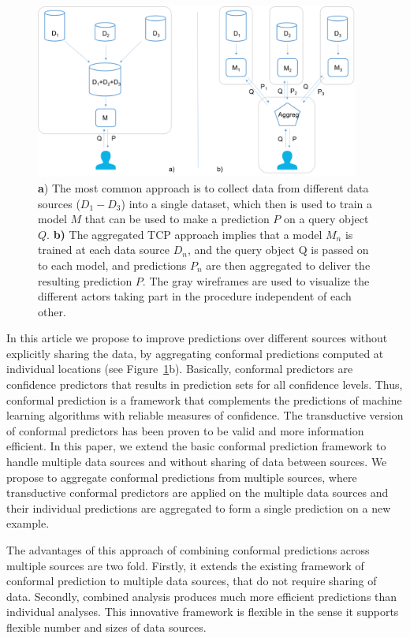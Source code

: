 \documentclass[main]{subfiles}
\begin{document}
 \begin{figure}[b!]
    \includegraphics[width=0.95\textwidth]{images/fig-overview.png}
    \caption{\textbf{a}) The most common approach is to collect data from different data sources ($D_1-D_3$) into a single dataset, which then is used to train a model $M$ that can be used to make a prediction $P$ on a query object $Q$. \textbf{b)} The aggregated TCP approach implies that a model $M_n$ is trained at each data source $D_n$, and the query object Q is passed on to each model, and predictions $P_n$ are then aggregated to deliver the resulting prediction $P$. The gray wireframes are used to visualize the different actors taking part in the procedure independent of each other.}
  \label{fig:overview}
\end{figure}

In this article we propose to improve predictions over different sources without explicitly sharing the data, by aggregating conformal predictions computed at individual locations (see Figure~\ref{fig:overview}b). 
Basically, conformal predictors are confidence predictors that results in prediction sets for all confidence levels. Thus, conformal prediction is a framework that complements the predictions of machine learning algorithms with reliable measures of confidence.
The transductive version of conformal predictors has been proven to be valid and more information efficient. In this paper, we extend the basic conformal prediction framework to handle multiple data sources and without sharing of data between sources. We propose to aggregate conformal predictions from multiple sources, where transductive conformal predictors are applied on the multiple data sources and their individual predictions are aggregated to form a single prediction on a new example.

The advantages of this approach of combining conformal predictions across multiple sources are two fold. 
Firstly, it extends the existing framework of conformal prediction to multiple data sources, that do not require sharing of data. Secondly, combined analysis produces much more efficient predictions than individual analyses. This innovative framework is flexible in the sense it supports flexible number and sizes of data sources.
\end{document}
